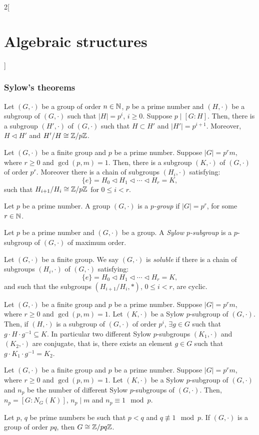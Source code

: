 \documentclass[../../../main.tex]{subfiles}
\begin{document}
\begin{multicols}{2}[\section{Algebraic structures}]
  \subsubsection{Sylow's theorems}
  \begin{corollary}
    Let $(G,\cdot)$ be a group of order $n\in\mathbb{N} $, $p$ be a prime number and $(H,\cdot)$ be a subgroup of $(G,\cdot)$ such that $|H|=p^i$, $i\geq 0$. Suppose $p\mid[G:H]$. Then, there is a subgroup $(H',\cdot)$ of $(G,\cdot)$ such that $H\subset H'$ and $|H'|=p^{i+1}$. Moreover, $H\lhd H'$ and $H'/H\cong\mathbb{Z} /p\mathbb{Z} $.
  \end{corollary}
  \begin{theorem}
    Let $(G,\cdot)$ be a finite group and $p$ be a prime number. Suppose $|G|=p^r m$, where $r\geq 0$ and $\gcd(p,m)=1$. Then, there is a subgroup $(K,\cdot)$ of $(G,\cdot)$ of order $p^r$. Moreover there is a chain of subgroups $(H_i,\cdot)$ satisfying: $$\{e\}=H_0\lhd H_1\lhd\cdots\lhd H_r=K,$$ such that $H_{i+1}/H_i\cong\mathbb{Z} /p\mathbb{Z} $ for $0\leq i<r$.
  \end{theorem}
  \begin{definition}
    Let $p$ be a prime number. A group $(G,\cdot)$ is a \textit{$p$-group} if $|G|=p^r$, for some $r\in\mathbb{N} $.
  \end{definition}
  \begin{definition}
    Let $p$ be a prime number and $(G,\cdot)$ be a group. A \textit{Sylow $p$-subgroup} is a $p$-subgroup of $(G,\cdot)$ of maximum order.
  \end{definition}
  \begin{definition}
    Let $(G,\cdot)$ be a finite group. We say $(G,\cdot)$ is \textit{soluble} if there is a chain of subgroups $(H_i,\cdot)$ of $(G,\cdot)$ satisfying: $$\{e\}=H_0\lhd H_1\lhd\cdots\lhd H_r=K,$$ and such that the subgroups $(H_{i+1}/H_i,*)$, $0\leq i<r$, are cyclic.
  \end{definition}
  \begin{theorem}
    Let $(G,\cdot)$ be a finite group and $p$ be a prime number. Suppose $|G|=p^r m$, where $r\geq 0$ and $\gcd(p,m)=1$. Let $(K,\cdot)$ be a Sylow $p$-subgroup of $(G,\cdot)$. Then, if $(H,\cdot)$ is a subgroup of $(G,\cdot)$ of order $p^i$, $\exists g\in G$ such that $g\cdot H\cdot g^{-1}\subseteq K$. In particular two different Sylow $p$-subgroups $(K_1,\cdot)$ and $(K_2,\cdot)$ are conjugate, that is, there exists an element $g\in G$ such that $g\cdot K_1\cdot g^{-1}=K_2$.
  \end{theorem}
  \begin{theorem}
    Let $(G,\cdot)$ be a finite group and $p$ be a prime number. Suppose $|G|=p^r m$, where $r\geq 0$ and $\gcd(p,m)=1$. Let $(K,\cdot)$ be a Sylow $p$-subgroup of $(G,\cdot)$ and $n_p$ be the number of different Sylow $p$-subgroups of $(G,\cdot)$. Then, $n_p=[G:N_G(K)]$, $n_p\mid m$ and $n_p\equiv1\mod p$.
  \end{theorem}
  \begin{corollary}
    Let $p$, $q$ be prime numbers be such that $p<q$ and $q\not\equiv 1\mod p$. If $(G,\cdot)$ is a group of order $pq$, then $G\cong\quot{\ZZ}{pq\ZZ}$.
  \end{corollary}

\end{multicols}
\end{document}
